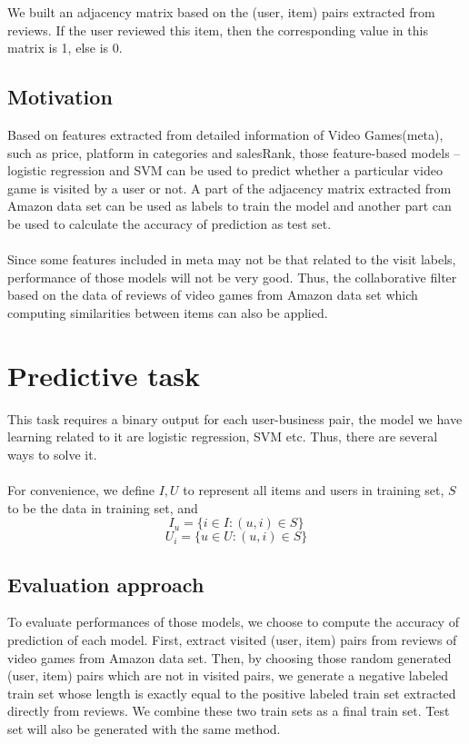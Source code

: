 \documentclass[paper=a4, fontsize=11pt, twocolumn]{scrartcl} %
\numberwithin{equation}{section} %
\numberwithin{figure}{section} %
\numberwithin{table}{section} %
\begin{document}
We built an adjacency matrix based on the (user, item) pairs extracted from reviews. If the user reviewed this item, then the corresponding value in this matrix is 1, else is 0.


\subsection{Motivation} 
Based on features extracted from detailed information of Video Games(meta), such as price, platform in categories and salesRank, those feature-based models – logistic regression and SVM can be used to predict whether a particular video game is visited by a user or not. A part of the adjacency matrix extracted from Amazon data set can be used as labels to train the model and another part can be used to calculate the accuracy of prediction as test set.\\
\\
Since some features included in meta may not be that related to the visit labels, performance of those models will not be very good. Thus, the collaborative filter based on the data of reviews of video games from Amazon data set which computing similarities between items can also be applied.  

\section{Predictive task}

This task requires a binary output for each user-business pair, the model we have learning related to it are logistic regression, SVM etc. Thus, there are several ways to solve it.\\
\\
For convenience, we define $I, U$ to represent all items and users in training set, $S$ to be the data in training set, and 
$$ I_u = \{i\in I:(u,i)\in S \} $$
$$ U_i = \{u\in U:(u,i)\in S \} $$

\subsection{Evaluation approach}

To evaluate performances of those models, we choose to compute the accuracy of prediction of each model. First, extract visited (user, item) pairs from reviews of video games from Amazon data set. Then, by choosing those random generated (user, item) pairs which are not in visited pairs, we generate a negative labeled train set whose length is exactly equal to the positive labeled train set extracted directly from reviews. We combine these two train sets as a final train set. Test set will also be generated with the same method.
\end{document}
